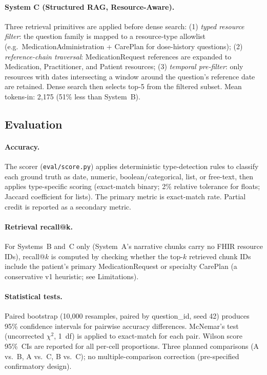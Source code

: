 \paragraph{System C (Structured RAG, Resource-Aware).}
Three retrieval primitives are applied before dense search:
(1) \emph{typed resource filter}: the question family is mapped to a resource-type allowlist
(e.g.\ MedicationAdministration + CarePlan for dose-history questions);
(2) \emph{reference-chain traversal}: MedicationRequest references are expanded to
Medication, Practitioner, and Patient resources;
(3) \emph{temporal pre-filter}: only resources with dates intersecting a window around
the question's reference date are retained.  Dense search then selects top-5 from the
filtered subset.  Mean tokens-in: 2,175 (51\% less than System~B).

\subsection{Evaluation}
\label{sec:methods:eval}

\paragraph{Accuracy.}
The scorer (\texttt{eval/score.py}) applies deterministic type-detection rules to classify
each ground truth as date, numeric, boolean/categorical, list, or free-text, then applies
type-specific scoring (exact-match binary; 2\% relative tolerance for floats; Jaccard
coefficient for lists).  The primary metric is exact-match rate.  Partial credit is reported as a secondary metric.

\paragraph{Retrieval recall@k.}
For Systems~B and~C only (System~A's narrative chunks carry no FHIR resource IDs), recall@$k$
is computed by checking whether the top-$k$ retrieved chunk IDs include the patient's primary
MedicationRequest or specialty CarePlan (a conservative v1 heuristic; see Limitations).

\paragraph{Statistical tests.}
Paired bootstrap (10,000 resamples, paired by question\_id, seed 42) produces 95\%
confidence intervals for pairwise accuracy differences.  McNemar's test (uncorrected
$\chi^2$, 1~df) is applied to exact-match for each pair.  Wilson score 95\%~CIs are reported
for all per-cell proportions.  Three planned comparisons (A vs.\ B, A vs.\ C, B vs.\ C);
no multiple-comparison correction (pre-specified confirmatory design).

